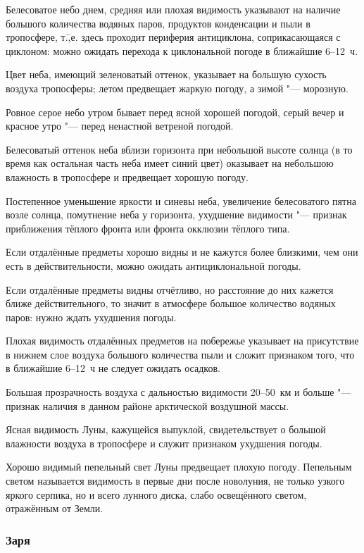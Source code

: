  Белесоватое небо днем, средняя или плохая видимость указывают
на наличие большого количества водяных паров, продуктов конденсации и
пыли в тропосфере, т.\=,е. здесь проходит периферия антициклона,
соприкасающаяся с циклоном: можно ожидать перехода к циклональной
погоде в ближайшие 6--12~ч.

 Цвет неба, имеющий зеленоватый оттенок, указывает на большую
сухость воздуха тропосферы; летом предвещает жаркую погоду, а зимой "---
морозную.

 Ровное серое небо утром бывает перед ясной хорошей погодой,
серый вечер и красное утро "--- перед ненастной ветреной погодой.

 Белесоватый оттенок неба вблизи горизонта при небольшой высоте
солнца (в то время как остальная часть неба имеет синий цвет)
оказывает на небольшою влажность в тропосфере и предвещает хорошую
погоду.

 Постепенное уменьшение яркости и синевы неба, увеличение
белесоватого пятна возле солнца, помутнение неба у горизонта,
ухудшение видимости "--- признак приближения тёплого фронта или фронта
окклюзии тёплого типа.

 Если отдалённые предметы хорошо видны и не кажутся более
близкими, чем они есть в действительности, можно ожидать
антициклональной погоды.

 Если отдалённые предметы видны отчётливо, но расстояние до них
кажется ближе действительного, то значит в атмосфере большое
количество водяных паров: нужно ждать ухудшения погоды.

 Плохая видимость отдалённых предметов на побережье указывает
на присутствие в нижнем слое воздуха большого количества пыли и сложит
признаком того, что в ближайшие 6--12~ч не следует ожидать осадков.

 Большая прозрачность воздуха с дальностью видимости 20--50~км
и больше "--- признак наличия в данном районе арктической воздушной
массы.

 Ясная видимость Луны, кажущейся выпуклой, свидетельствует о
большой влажности воздуха в тропосфере и служит признаком ухудшения
погоды.

 Хорошо видимый пепельный свет Луны предвещает плохую
погоду. Пепельным светом называется видимость в первые дни после
новолуния, не только узкого яркого серпика, но и всего лунного диска,
слабо освещённого светом, отражённым от Земли.

\subsubsection{Заря}

